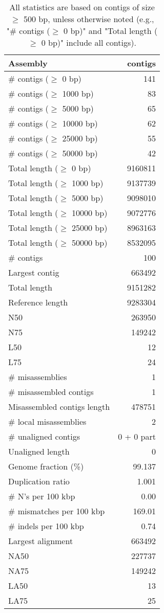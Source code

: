\documentclass[12pt,a4paper]{article}
\begin{document}
\begin{table}[ht]
\begin{center}
\caption{All statistics are based on contigs of size $\geq$ 500 bp, unless otherwise noted (e.g., "\# contigs ($\geq$ 0 bp)" and "Total length ($\geq$ 0 bp)" include all contigs).}
\begin{tabular}{|l*{1}{|r}|}
\hline
Assembly & contigs \\ \hline
\# contigs ($\geq$ 0 bp) & 141 \\ \hline
\# contigs ($\geq$ 1000 bp) & 83 \\ \hline
\# contigs ($\geq$ 5000 bp) & 65 \\ \hline
\# contigs ($\geq$ 10000 bp) & 62 \\ \hline
\# contigs ($\geq$ 25000 bp) & 55 \\ \hline
\# contigs ($\geq$ 50000 bp) & 42 \\ \hline
Total length ($\geq$ 0 bp) & 9160811 \\ \hline
Total length ($\geq$ 1000 bp) & 9137739 \\ \hline
Total length ($\geq$ 5000 bp) & 9098010 \\ \hline
Total length ($\geq$ 10000 bp) & 9072776 \\ \hline
Total length ($\geq$ 25000 bp) & 8963163 \\ \hline
Total length ($\geq$ 50000 bp) & 8532095 \\ \hline
\# contigs & 100 \\ \hline
Largest contig & 663492 \\ \hline
Total length & 9151282 \\ \hline
Reference length & 9283304 \\ \hline
N50 & 263950 \\ \hline
N75 & 149242 \\ \hline
L50 & 12 \\ \hline
L75 & 24 \\ \hline
\# misassemblies & 1 \\ \hline
\# misassembled contigs & 1 \\ \hline
Misassembled contigs length & 478751 \\ \hline
\# local misassemblies & 2 \\ \hline
\# unaligned contigs & 0 + 0 part \\ \hline
Unaligned length & 0 \\ \hline
Genome fraction (\%) & 99.137 \\ \hline
Duplication ratio & 1.001 \\ \hline
\# N's per 100 kbp & 0.00 \\ \hline
\# mismatches per 100 kbp & 169.01 \\ \hline
\# indels per 100 kbp & 0.74 \\ \hline
Largest alignment & 663492 \\ \hline
NA50 & 227737 \\ \hline
NA75 & 149242 \\ \hline
LA50 & 13 \\ \hline
LA75 & 25 \\ \hline
\end{tabular}
\end{center}
\end{table}
\end{document}
